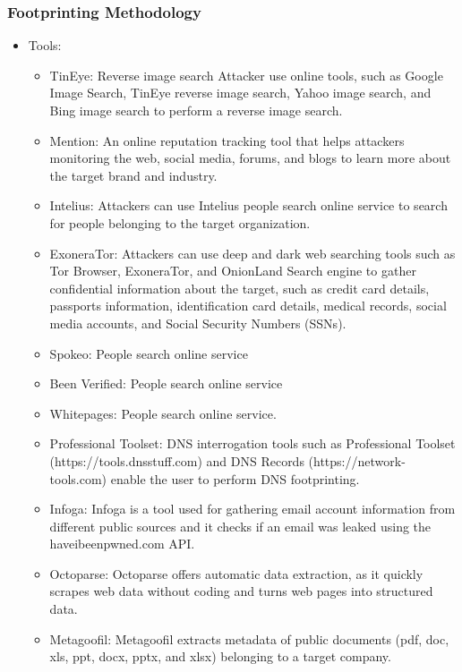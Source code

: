 \subsubsection{Footprinting Methodology}
\begin{itemize}
    \item Tools:
    \begin{itemize}
        \item TinEye: Reverse image search Attacker use online tools, such as Google Image Search, TinEye reverse image search, Yahoo image search, and Bing image search to perform a reverse image search.
        \item Mention: An online reputation tracking tool that helps attackers monitoring the web, social media, forums, and blogs to learn more about the target brand and industry.
        \item Intelius: Attackers can use Intelius people search online service to search for people belonging to the target organization.
        \item ExoneraTor: Attackers can use deep and dark web searching tools such as Tor Browser, ExoneraTor, and OnionLand Search engine to gather confidential information about the target, such as credit card details, passports information, identification card details, medical records, social media accounts, and Social Security Numbers (SSNs).
        \item Spokeo: People search online service
        \item Been Verified: People search online service
        \item Whitepages: People search online service.
        \item Professional Toolset: DNS interrogation tools such as Professional Toolset (https://tools.dnsstuff.com) and DNS Records (https://network-tools.com) enable the user to perform DNS footprinting.
        \item Infoga: Infoga is a tool used for gathering email account information from different public sources and it checks if an email was leaked using the haveibeenpwned.com API.
        \item Octoparse: Octoparse offers automatic data extraction, as it quickly scrapes web data without coding and turns web pages into structured data.
        \item Metagoofil: Metagoofil extracts metadata of public documents (pdf, doc, xls, ppt, docx, pptx, and xlsx) belonging to a target company.
    \end{itemize}

\end{itemize}
